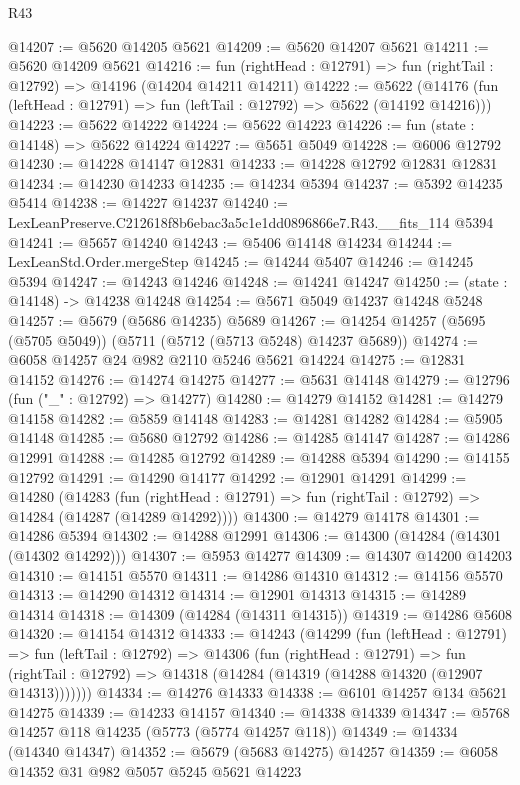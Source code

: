 \begin{lexlean}{R43}
\begin{coremodule}
@14207 := @5620 @14205 @5621
@14209 := @5620 @14207 @5621
@14211 := @5620 @14209 @5621
@14216 := fun (rightHead : @12791) => fun (rightTail : @12792) => @14196 (@14204 @14211 @14211)
@14222 := @5622
    (@14176 (fun (leftHead : @12791) => fun (leftTail : @12792) => @5622 (@14192 @14216)))
@14223 := @5622 @14222
@14224 := @5622 @14223
@14226 := fun (state : @14148) => @5622 @14224
@14227 := @5651 @5049
@14228 := @6006 @12792
@14230 := @14228 @14147 @12831
@14233 := @14228 @12792 @12831 @12831
@14234 := @14230 @14233
@14235 := @14234 @5394
@14237 := @5392 @14235 @5414
@14238 := @14227 @14237
@14240 := LexLeanPreserve.C212618f8b6ebac3a5c1e1dd0896866e7.R43.__fits_114 @5394
@14241 := @5657 @14240
@14243 := @5406 @14148 @14234
@14244 := LexLeanStd.Order.mergeStep
@14245 := @14244 @5407
@14246 := @14245 @5394
@14247 := @14243 @14246
@14248 := @14241 @14247
@14250 := (state : @14148) -> @14238 @14248
@14254 := @5671 @5049 @14237 @14248 @5248
@14257 := @5679 (@5686 @14235) @5689
@14267 := @14254 @14257 (@5695 (@5705 @5049)) (@5711 (@5712 (@5713 @5248) @14237 @5689))
@14274 := @6058 @14257 @24 @982 @2110 @5246 @5621 @14224
@14275 := @12831 @14152
@14276 := @14274 @14275
@14277 := @5631 @14148
@14279 := @12796 (fun ("_" : @12792) => @14277)
@14280 := @14279 @14152
@14281 := @14279 @14158
@14282 := @5859 @14148
@14283 := @14281 @14282
@14284 := @5905 @14148
@14285 := @5680 @12792
@14286 := @14285 @14147
@14287 := @14286 @12991
@14288 := @14285 @12792
@14289 := @14288 @5394
@14290 := @14155 @12792
@14291 := @14290 @14177
@14292 := @12901 @14291
@14299 := @14280
    (@14283
      (fun (rightHead : @12791) => fun (rightTail : @12792) => @14284 (@14287 (@14289 @14292))))
@14300 := @14279 @14178
@14301 := @14286 @5394
@14302 := @14288 @12991
@14306 := @14300 (@14284 (@14301 (@14302 @14292)))
@14307 := @5953 @14277
@14309 := @14307 @14200 @14203
@14310 := @14151 @5570
@14311 := @14286 @14310
@14312 := @14156 @5570
@14313 := @14290 @14312
@14314 := @12901 @14313
@14315 := @14289 @14314
@14318 := @14309 (@14284 (@14311 @14315))
@14319 := @14286 @5608
@14320 := @14154 @14312
@14333 := @14243
    (@14299
      (fun (leftHead : @12791) =>
      fun (leftTail : @12792) =>
      @14306
        (fun (rightHead : @12791) =>
        fun (rightTail : @12792) => @14318 (@14284 (@14319 (@14288 @14320 (@12907 @14313)))))))
@14334 := @14276 @14333
@14338 := @6101 @14257 @134 @5621 @14275
@14339 := @14233 @14157
@14340 := @14338 @14339
@14347 := @5768 @14257 @118 @14235 (@5773 (@5774 @14257 @118))
@14349 := @14334 (@14340 @14347)
@14352 := @5679 (@5683 @14275) @14257
@14359 := @6058 @14352 @31 @982 @5057 @5245 @5621 @14223

\end{coremodule}
\end{lexlean}
